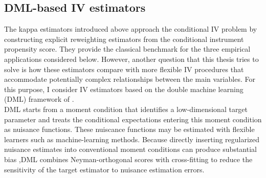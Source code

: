 \documentclass[12pt, a4paper, oneside]{article}
\theoremstyle{plain}
\theoremstyle{definition}
\begin{document}
\subsection{DML-based IV estimators}
The kappa estimators introduced above approach the conditional IV problem by
constructing explicit reweighting estimators from the conditional instrument
propensity score. 
They provide the classical benchmark for the three empirical
applications considered below.
However, another question that this thesis tries to solve is how these
estimators compare with more flexible IV procedures that accommodate potentially
complex relationships between the main variables. 
For this purpose, I consider IV estimators based on the double machine learning
(DML) framework of \citet{chernozhukov2018double}.\\
DML starts from a moment condition that identifies a low-dimensional target
parameter and treats the conditional expectations entering this moment condition
as nuisance functions.
These nuiscance functions may be estimated
with flexible learners such as machine-learning methods. 
 Because directly inserting regularized
nuisance estimates into conventional moment conditions can produce substantial
bias %
,DML combines Neyman-orthogonal scores with cross-fitting to reduce the
sensitivity of the target estimator to nuisance estimation errors.
\end{document}
